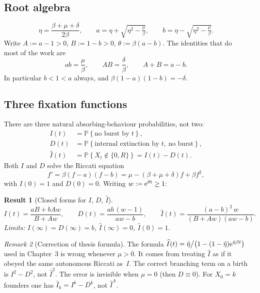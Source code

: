 \documentclass[11pt,a4paper]{article}
\newcommand{\ee}{{\rm e}}
\newcommand{\Prob}[1]{\mathbb{P}\!\left\{#1\right\}}
\newcommand{\xt}{X_t}
\newcommand{\Ihat}{\widehat{I}}
\newcommand{\Aa}{A}
\newcommand{\Bb}{B}
\theoremstyle{plain}
\newtheorem{result}{Result}[section]
\theoremstyle{definition}
\theoremstyle{remark}
\newtheorem{remark}[result]{Remark}
\begin{document}
\subsection{Root algebra}

\begin{equation}
\eta=\frac{\beta+\mu+\delta}{2\beta},\qquad
a=\eta+\sqrt{\eta^2-\tfrac{\mu}{\beta}},\qquad
b=\eta-\sqrt{\eta^2-\tfrac{\mu}{\beta}}.
\end{equation}
Write $\Aa:=a-1>0$, $\Bb:=1-b>0$, $\theta:=\beta(a-b)$. The identities that do
most of the work are
\begin{equation}
\label{eq:AB}
ab=\frac{\mu}{\beta},\qquad
\Aa\Bb=\frac{\delta}{\beta},\qquad
\Aa+\Bb=a-b.
\end{equation}
In particular $b<1<a$ always, and $\beta(1-a)(1-b)=-\delta$.

\subsection{Three fixation functions}

There are three natural absorbing-behaviour probabilities, not two:
\begin{align}
I(t)&=\Prob{\text{no burst by }t},\\
D(t)&=\Prob{\text{internal extinction by }t,\ \text{no burst}},\\
\Ihat(t)&=\Prob{\xt\notin\{0,R\}}=I(t)-D(t).
\end{align}
Both $I$ and $D$ solve the Riccati equation
\[
f'=\beta(f-a)(f-b)=\mu-(\beta+\mu+\delta)f+\beta f^2,
\]
with $I(0)=1$ and $D(0)=0$. Writing $w:=\ee^{\theta t}\ge 1$:
\begin{result}[Closed forms for $I$, $D$, $\Ihat$]
\begin{equation}
I(t)=\frac{a\Bb+b\Aa w}{\Bb+\Aa w},\qquad
D(t)=\frac{ab\,(w-1)}{aw-b},\qquad
\Ihat(t)=\frac{(a-b)^2\,w}{(\Bb+\Aa w)(aw-b)}.
\end{equation}
Limits: $I(\infty)=D(\infty)=b$, $\Ihat(\infty)=0$, $\Ihat(0)=1$.
\end{result}

\begin{remark}[Correction of thesis formula]
The formula $\Ihat(t)=\hat\eta\big/\bigl(1-(1-\hat\eta)\ee^{\hat\eta\beta t}\bigr)$
used in Chapter~3 is wrong whenever $\mu>0$. It comes from treating $\Ihat$ as if
it obeyed the same autonomous Riccati as~$I$. The correct branching term on a
birth is $I^2-D^2$, not $\Ihat^2$. The error is invisible when $\mu=0$ (then
$D\equiv 0$). For $X_0=k$ founders one has $\Ihat_k=I^k-D^k$, not $\Ihat^{\,k}$.
\end{remark}
\end{document}
